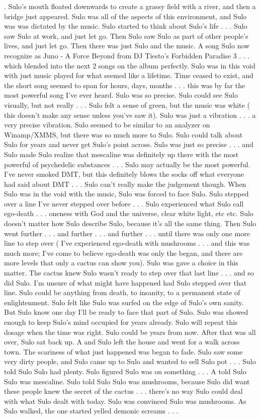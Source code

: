 \documentclass[12pt]{book}
\begin{document}
.  Sulo's mouth floated downwards to create a grassy field with a river, and then a bridge just appeared. Sulo was all of the aspects of this environment, and Sulo was was dictated by the music. Sulo started to think about Sulo's life . . .  Sulo saw Sulo at work, and just let go. Then Sulo saw Sulo as part of other people's lives, and just let go. Then there was just Sulo and the music. A song Sulo now recognize as Juno - A Force Beyond from DJ Tiesto's Forbidden Paradise 3 . . .  which blended into the next 2 songs on the album perfectly. Sulo was in this void with just music played for what seemed like a lifetime. Time ceased to exist, and the short song seemed to span for hours, days, months . . .  this was by far the most powerful song I've ever heard. Sulo was so precise. Sulo could see Sulo visually, but not really . . .  Sulo felt a sense of green, but the music was white ( this doesn't make any sense unless you've saw it). Sulo was just a vibration . . .  a very precise vibration. Sulo seemed to be similar to an analyzer on Winamp/XMMS, but there was so much more to Sulo. Sulo could talk about Sulo for years and never get Sulo's point across. Sulo was just so precise . . .  and Sulo made Sulo realize that mescaline was definitely up there with the most powerful of psychedelic substances . . .  Sulo may actually be the most powerful. I've never smoked DMT, but this definitely blows the socks off what everyone had said about DMT . . .  Sulo can't really make the judgement though. When Sulo was in the void with the music, Sulo was forced to face Sulo. Sulo stepped over a line I've never stepped over before . . .  Sulo experienced what Sulo call ego-death . . .  oneness with God and the universe, clear white light, etc etc. Sulo doesn't matter how Sulo describe Sulo, because it's all the same thing. Then Sulo went further . . .  and further . . .  and further . . .  until there was only one more line to step over ( I've experienced ego-death with mushrooms . . .  and this was much more; I've come to believe ego-death was only the began, and there are more levels that only a cactus can show you). Sulo was gave a choice in this matter. The cactus knew Sulo wasn't ready to step over that last line . . .  and so did Sulo. I'm unsure of what might have happened had Sulo stepped over that line. Sulo could be anything from death, to insanity, to a permanent state of enlightenment. Sulo felt like Sulo was surfed on the edge of Sulo's own sanity. But Sulo know one day I'll be ready to face that part of Sulo. Sulo was showed enough to keep Sulo's mind occupied for years already. Sulo will repeat this dosage when the time was right. Sulo could be years from now. After that was all over, Sulo sat back up. A and Sulo left the house and went for a walk across town. The scariness of what just happened was began to fade. Sulo saw some very dirty people, and Sulo came up to Sulo and wanted to sell Sulo pot . . .  Sulo told Sulo Sulo had plenty. Sulo figured Sulo was on something . . .  A told Sulo Sulo was mescaline. Sulo told Sulo Sulo was mushrooms, because Sulo did want these people knew the secret of the cactus . . .  there's no way Sulo could deal with what Sulo dealt with today. Sulo was convinced Sulo was mushrooms. As Sulo walked, the one started yelled demonic screams . . .  
\end{document}
